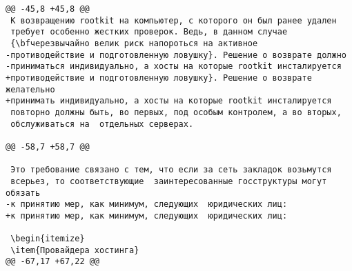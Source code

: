 \begin{verbatim}
@@ -45,8 +45,8 @@
 К возвращению rootkit на компьютер, с которого он был ранее удален
 требует особенно жестких проверок. Ведь, в данном случае
 {\bfчерезвычайно велик риск напороться на активное
-противодействие и подготовленную ловушку}. Решение о возврате должно
-приниматься индивидуально, а хосты на которые rootkit инсталируется
+противодействие и подготовленную ловушку}. Решение о возврате желательно
+принимать индивидуально, а хосты на которые rootkit инсталируется
 повторно должны быть, во первых, под особым контролем, а во вторых,
 обслуживаться на  отдельных серверах.

@@ -58,7 +58,7 @@

 Это требование связано с тем, что если за сеть закладок возьмутся
 всерьез, то соответствующие  заинтересованные госструктуры могут обязать
-к принятию мер, как минимум, следующих  юридических лиц:
+к принятию мер, как минимум, следующих  юридических лиц:

 \begin{itemize}
 \item{Провайдера хостинга}
@@ -67,17 +67,22 @@


\end{verbatim}
